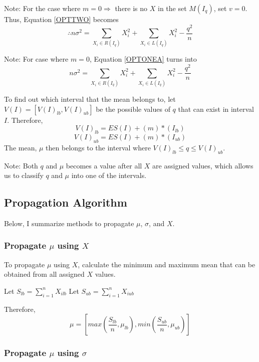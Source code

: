 \documentclass[a4paper,12pt]{article}
\begin{document}
Note: For the case where $m = 0 \Rightarrow$ there is no $X$ in the set $M(I_{q})$, set $v=0$. 
Thus, Equation \ref{OPTTWO} becomes
\begin{equation}
\label{OPTTHREE} \therefore n\sigma^2 = \sum_{X_{i} \in R(I_{q})}X_{i}^2 + \sum_{X_{i} \in L(I_{q})}X_{i}^2  - \frac{q^2}{n} 
\end{equation} 

Note: For case where $m = 0$, Equation \ref{OPTONEA} turns into 
\begin{equation}
\label{OPTONEB}
 n\sigma^2  = \sum_{X_{i} \in R(I_{q})}X_{i}^2 + \sum_{X_{i} \in L(I_{q})}X_{i}^2 - \frac{q^2}{n}  
\end{equation} 


To find out which interval that the mean belongs to, 
let $V(I) = [V(I)_{lb}, V(I)_{ub}]$ be the possible values of $q$ that can exist in interval $I$. Therefore, 
$$V(I)_{lb} = ES(I) + (m)*(I_{lb})$$
$$V(I)_{ub} = ES(I) + (m)*(I_{ub})$$
The mean, $\mu$ then belongs to the interval where $V(I)_{lb} \leq q \leq V(I)_{ub}$. 

Note: Both $q$ and $\mu$ becomes a value after all $X$ are assigned values, which allows us to classify $q$ and $\mu$ into one of the intervals. 

\subsection{Propagation Algorithm}
Below, I summarize methods to propagate $\mu$, $\sigma$, and $X$. 

\subsubsection{Propagate $\mu$ using $X$}
To propagate $\mu$ using $X$, 
calculate the minimum and maximum mean that can be obtained from all assigned $X$ values. 

Let $S_{lb} = \sum\limits_{i=1}^n X_{ilb}$
Let $S_{ub} = \sum\limits_{i=1}^n X_{iub}$

Therefore, 
\begin{equation}
\mu = [max(\frac{S_{lb}}{n}, \mu_{lb}) , min(\frac{S_{ub}}{n}, \mu_{ub})]
\end{equation} 

\subsubsection{Propagate $\mu$ using $\sigma$}
\end{document}
